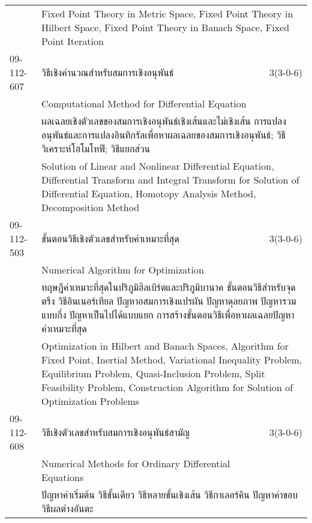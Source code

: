 \begin{longtable}{p{}p{}r{}}
&  \multicolumn{2}{p{0.75\textwidth}}{Fixed Point Theory in Metric Space, Fixed Point Theory in Hilbert Space, Fixed Point Theory in Banach Space, Fixed Point Iteration} \vspace{8mm} \\*
09-112-607 & วิธีเชิงคำนวณสำหรับสมการเชิงอนุพันธ์ & 3(3-0-6)\\*
 & Computational Method for Differential Equation & \phantom{x} \vspace{3mm} \\*
&  \multicolumn{2}{p{0.75\textwidth}}{ผลเฉลยเชิงตัวเลขของสมการเชิงอนุพันธ์เชิงเส้นและไม่เชิงเส้น การแปลงอนุพันธ์และการแปลงอินทิกรัลเพื่อหาผลเฉลยของสมการเชิงอนุพันธ์; วิธีวิเคราะห์โฮโมโทฟี; วิธีแยกส่วน} \vspace{3mm} \\*
&  \multicolumn{2}{p{0.75\textwidth}}{Solution of Linear and Nonlinear Differential Equation, Differential Transform and Integral Transform for Solution of Differential Equation, Homotopy Analysis Method, Decomposition Method} \vspace{8mm} \\*
09-112-503 & ขั้นตอนวิธีเชิงตัวเลขสำหรับค่าเหมาะที่สุด & 3(3-0-6)\\*
 & Numerical Algorithm for Optimization & \phantom{x} \vspace{3mm} \\*
&  \multicolumn{2}{p{0.75\textwidth}}{ทฤษฎีค่าเหมาะที่สุดในปริภูมิฮิลเบิร์ตและปริภูมิบานาค ขั้นตอนวิธีสำหรับจุดตรึง วิธีอินเนอร์เทียล ปัญหาอสมการเชิงแปรผัน ปัญหาดุลยภาพ ปัญหารวมแบบกึ่ง ปัญหาเป็นไปได้แบบแยก การสร้างขั้นตอนวิธีเพื่อหาผลเฉลยปัญหาค่าเหมาะที่สุด} \vspace{3mm} \\*
&  \multicolumn{2}{p{0.75\textwidth}}{Optimization in Hilbert and Banach Spaces, Algorithm for Fixed Point, Inertial Method, Variational Inequality Problem, Equilibrium Problem, Quasi-Inclusion Problem, Split Feasibility Problem, Construction Algorithm for Solution of Optimization Problems} \vspace{8mm} \\*
09-112-608 & วิธีเชิงตัวเลขสำหรับสมการเชิงอนุพันธ์สามัญ & 3(3-0-6)\\*
 & Numerical Methods for Ordinary Differential Equations & \phantom{x} \vspace{3mm} \\*
&  \multicolumn{2}{p{0.75\textwidth}}{ปัญหาค่าเริ่มต้น วิธีขั้นเดียว วิธีหลายขั้นเชิงเส้น วิธีกาเลอร์คิน ปัญหาค่าขอบ วิธีผลต่างอันตะ} \vspace{3mm} \\*

\end{longtable}
